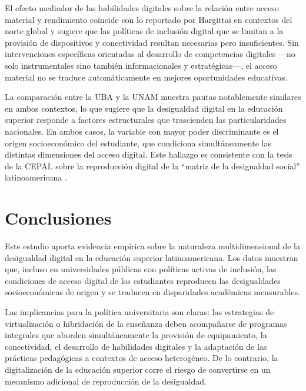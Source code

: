 \documentclass{article}
\begin{document}
El efecto mediador de las habilidades digitales sobre la relación entre acceso material y rendimiento coincide con lo reportado por Hargittai \autocite*{2565-HARGITTAI2002} en contextos del norte global y sugiere que las políticas de inclusión digital que se limitan a la provisión de dispositivos y conectividad resultan necesarias pero insuficientes. Sin intervenciones específicas orientadas al desarrollo de competencias digitales —no solo instrumentales sino también informacionales y estratégicas—, el acceso material no se traduce automáticamente en mejores oportunidades educativas.

La comparación entre la UBA y la UNAM muestra pautas notablemente similares en ambos contextos, lo que sugiere que la desigualdad digital en la educación superior responde a factores estructurales que trascienden las particularidades nacionales. En ambos casos, la variable con mayor poder discriminante es el origen socioeconómico del estudiante, que condiciona simultáneamente las distintas dimensiones del acceso digital. Este hallazgo es consistente con la tesis de la CEPAL sobre la reproducción digital de la “matriz de la desigualdad social” latinoamericana \autocite{2566-CEPAL2021}.


\section{Conclusiones}
Este estudio aporta evidencia empírica sobre la naturaleza multidimensional de la desigualdad digital en la educación superior latinoamericana. Los datos muestran que, incluso en universidades públicas con políticas activas de inclusión, las condiciones de acceso digital de los estudiantes reproducen las desigualdades socioeconómicas de origen y se traducen en disparidades académicas mensurables.

Las implicancias para la política universitaria son claras: las estrategias de virtualización o hibridación de la enseñanza deben acompañarse de programas integrales que aborden simultáneamente la provisión de equipamiento, la conectividad, el desarrollo de habilidades digitales y la adaptación de las prácticas pedagógicas a contextos de acceso heterogéneo. De lo contrario, la digitalización de la educación superior corre el riesgo de convertirse en un mecanismo adicional de reproducción de la desigualdad.



\printbibliography
\end{document}
